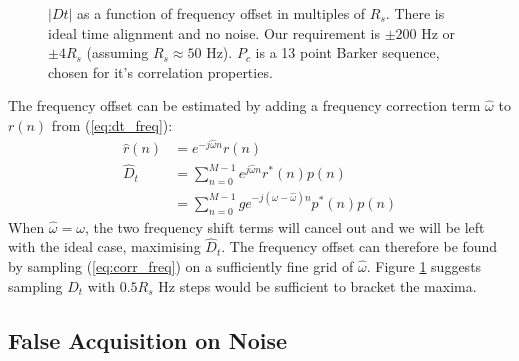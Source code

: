 \documentclass{article}
\begin{document}
\begin{figure}[H]
\caption{$|Dt|$ as a function of frequency offset in multiples of $R_s$.  There is ideal time alignment and no noise. Our requirement is $\pm 200$ Hz or $\pm 4R_s$ (assuming $R_s \approx 50$ Hz). $P_c$ is a 13 point Barker sequence, chosen for it's correlation properties.}
\label{fig:acq_dt_q}
\begin{center}

\end{center}
\end{figure}

The frequency offset can be estimated by adding a frequency correction term $\hat{\omega}$ to $r(n)$ from (\ref{eq:dt_freq}):
\begin{equation}
\begin{split}
\label{eq:corr_freq}
\hat{r}(n) &= e^{-j \hat{\omega} n}r(n) \\
\hat{D}_t &= \sum_{n=0}^{M-1} e^{j \hat{\omega} n} r^*(n) p(n) \\
    &= \sum_{n=0}^{M-1} g e^{-j (\omega - \hat{\omega} ) n} p^*(n)p(n) 
\end{split}
\end{equation}
When $\hat{\omega} = \omega$, the two frequency shift terms will cancel out and we will be left with the ideal  case, maximising $\hat{D}_t$. The frequency offset can therefore be found by sampling (\ref{eq:corr_freq}) on a sufficiently fine grid of $\hat{\omega}$.  Figure \ref{fig:acq_dt_q} suggests sampling $\hat{D}_t$ with $0.5R_s$ Hz steps would be sufficient to bracket the maxima.  

\subsection{False Acquisition on Noise}
\end{document}
